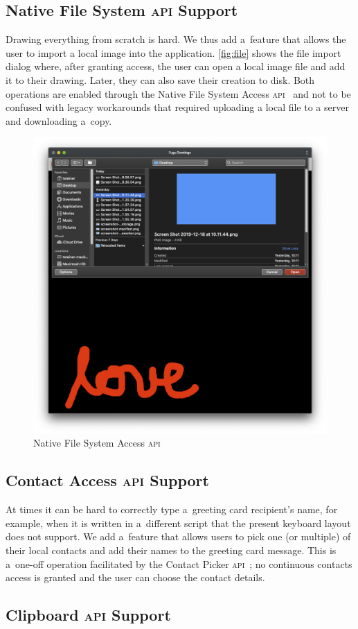 \documentclass[sigconf]{acmart}
\begin{document}
\subsection{Native File System \textsc{api} Support}

Drawing everything from scratch is hard.
We thus add a~feature that allows the user to import a local image into the application.
\autoref{fig:file} shows the file import dialog where, after granting access,
the user can open a local image file and add it to their drawing.
Later, they can also save their creation to disk.
Both operations are enabled through the Native File System Access \textsc{api}~\cite{kruisselbrink19}
and not to be confused with legacy workarounds that required uploading a local file to a server
and downloading a~copy.

\begin{figure}[hbt]
  \includegraphics[width=0.5\columnwidth]{file.png}
  \caption{Native File System Access \textsc{api}}
  \label{fig:file}
\end{figure}

\subsection{Contact Access \textsc{api} Support}

At times it can be hard to correctly type a~greeting card recipient's name,
for example, when it is written in a~different script
that the present keyboard layout does not support.
We add a~feature that allows users to pick one (or multiple) of their local contacts
and add their names to the greeting card message.
This is a~one-off operation facilitated by the Contact Picker \textsc{api}~\cite{beverloo19};
no continuous contacts access is granted
and the user can choose the contact details.

\subsection{Clipboard \textsc{api} Support}
\end{document}
